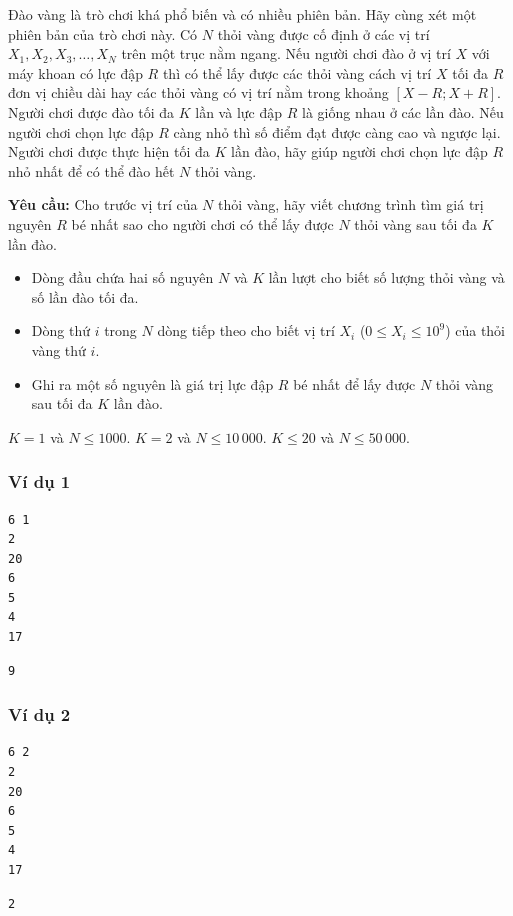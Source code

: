 
Đào vàng là trò chơi khá phổ biến và có nhiều phiên bản. Hãy cùng xét một phiên bản của trò chơi này. Có $N$ thỏi vàng được cố định ở các vị trí $X_1, X_2, X_3, \dots, X_N$ trên một trục nằm ngang. Nếu người chơi đào ở vị trí $X$ với máy khoan có lực đập $R$ thì có thể lấy được các thỏi vàng cách vị trí $X$ tối đa $R$ đơn vị chiều dài hay các thỏi vàng có vị trí nằm trong khoảng $[X - R; X + R]$. Người chơi được đào tối đa $K$ lần và lực đập $R$ là giống nhau ở các lần đào. Nếu người chơi chọn lực đập $R$ càng nhỏ thì số điểm đạt được càng cao và ngược lại. Người chơi được thực hiện tối đa $K$ lần đào, hãy giúp người chơi chọn lực đập $R$ nhỏ nhất để có thể đào hết $N$ thỏi vàng.

\medskip
\textbf{Yêu cầu:} Cho trước vị trí của $N$ thỏi vàng, hãy viết chương trình tìm giá trị nguyên $R$ bé nhất sao cho người chơi có thể lấy được $N$ thỏi vàng sau tối đa $K$ lần đào.

\begin{itemize}
    \item Dòng đầu chứa hai số nguyên $N$ và $K$ lần lượt cho biết số lượng thỏi vàng và số lần đào tối đa.
    \item Dòng thứ $i$ trong $N$ dòng tiếp theo cho biết vị trí $X_i$ ($0 \le X_i \le 10^9$) của thỏi vàng thứ $i$.
\end{itemize}

\begin{itemize}
    \item Ghi ra một số nguyên là giá trị lực đập $R$ bé nhất để lấy được $N$ thỏi vàng sau tối đa $K$ lần đào.
\end{itemize}

\begin{makesubtasks}
     $K = 1$ và $N \le 1000$.
     $K = 2$ và $N \le 10\,000$.
     $K \le 20$ và $N \le 50\,000$.
\end{makesubtasks}


\subsubsection*{Ví dụ 1}
\begin{makesample}
\begin{lstlisting}
6 1
2
20
6
5
4
17
\end{lstlisting}
\nextsample
\begin{lstlisting}
9
\end{lstlisting}
\end{makesample}

\subsubsection*{Ví dụ 2}
\begin{makesample}
\begin{lstlisting}
6 2
2
20
6
5
4
17
\end{lstlisting}
\nextsample
\begin{lstlisting}
2
\end{lstlisting}
\end{makesample}